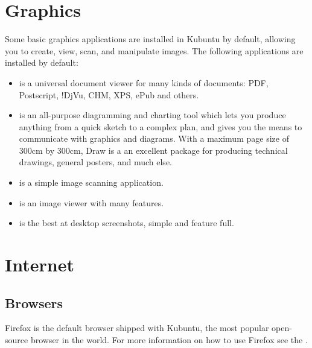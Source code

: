 \documentclass[letterpaper,10pt,english]{sphinxmanual}
\begin{document}
\section{Graphics}
\label{\detokenize{docs/software:graphics}}
Some basic graphics applications are installed in Kubuntu by default, allowing you to create, view, scan, and manipulate images. The following applications are installed by default:
\begin{itemize}
\item {} 
 is a universal document viewer for many kinds of documents: PDF, Postscript, !DjVu, CHM, XPS, ePub and others.

\item {} 
 is an all-purpose diagramming and charting tool which lets you produce anything from a quick sketch to a complex plan, and gives you the means to communicate with graphics and diagrams. With a maximum page size of 300cm by 300cm, Draw is a an excellent package for producing technical drawings, general posters, and much else.

\item {} 
 is a simple image scanning application.

\item {} 
 is an image viewer with many features.

\item {} 
 is the best at desktop screenshots, simple and feature full.

\end{itemize}


\section{Internet}
\label{\detokenize{docs/software:internet}}

\subsection{Browsers}
\label{\detokenize{docs/software:browsers}}
Firefox is the default browser shipped with Kubuntu, the most popular open-source browser in the world. For more information on how to use Firefox see the .
\end{document}
